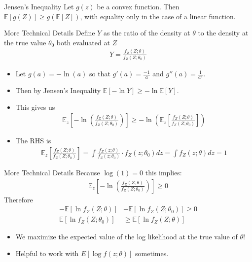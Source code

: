 \documentclass[aspectratio=169]{beamer}
\begin{document}
\begin{frame}{Jensen's Inequality}
Let $g(z)$ be a convex function. Then $\mathbb { E }[g(Z)] \geq g(\mathbb { E }[Z])$, with equality only in the case of a linear function.
\end{frame}

\begin{frame}{More Technical Details}
Define $Y$ as the ratio of the density at $\theta$ to the density at the true value $\theta_0$ both evaluated at $Z$
\begin{align*}
Y = \frac{f_Z(Z;\theta)}{f_Z(Z;\theta_0)}
\end{align*}
\begin{itemize}
\item Let $g(a) = -\ln(a)$ so that $g'(a) = \frac{-1}{a}$ and $g''(a) =\frac{1}{a^2}$.
\item Then by \alert{Jensen's Inequality} $\mathbb{E}[- \ln Y] \geq - \ln \mathbb{E}[Y]$.
\item This gives us
\begin{align*}
\mathbb { E }_z \left[ - \ln \left( \frac { f _ { Z } ( Z ; \theta ) } { f _ { Z } \left( Z ; \theta _ { 0 } \right) } \right) \right] \geq - \ln \left( \mathbb { E }_z \left[ \frac { f _ { Z } ( Z ; \theta ) } { f _ { Z } \left( Z ; \theta _ { 0 } \right) } \right] \right)
\end{align*}
\item The RHS is
\begin{align*}
\mathbb { E }_z \left[ \frac { f _ { Z } ( Z ; \theta ) } { f _ { Z } \left( Z ; \theta _ { 0 } \right) } \right] = \int \frac { f _ { Z } ( z ; \theta ) } { f _ { Z } \left( z ; \theta _ { 0 } \right) } \cdot f _ { Z } \left( z ; \theta _ { 0 } \right) d z = \int f _ { Z } ( z ; \theta ) d z = 1
\end{align*}
\end{itemize}
\end{frame}


\begin{frame}{More Technical Details}
Because $\log(1)=0$ this implies:
\begin{align*}
\mathbb { E }_z \left[ - \ln \left( \frac { f _ { Z } ( Z ; \theta ) } { f _ { Z } \left( Z ; \theta _ { 0 } \right) } \right) \right] \geq 0
\end{align*}
Therefore 
\begin{align*}
- \mathbb { E } \left[ \ln f _ { Z } ( Z ; \theta ) \right] &+ \mathbb { E } \left[ \ln f _ { Z } \left( Z ; \theta _ { 0 } \right) \right] \geq 0\\
\mathbb { E } \left[ \ln f _ { Z } \left( Z ; \theta _ { 0 } \right) \right] &\geq \mathbb { E } \left[ \ln f _ { Z } ( Z ; \theta ) \right]
\end{align*}
\begin{itemize}
\item We maximize the expected value of the log likelihood at the true value of $\theta$!
\item Helpful to work with $E[\log f(z; \theta)]$ sometimes.
\end{itemize}
\end{frame}
\end{document}
